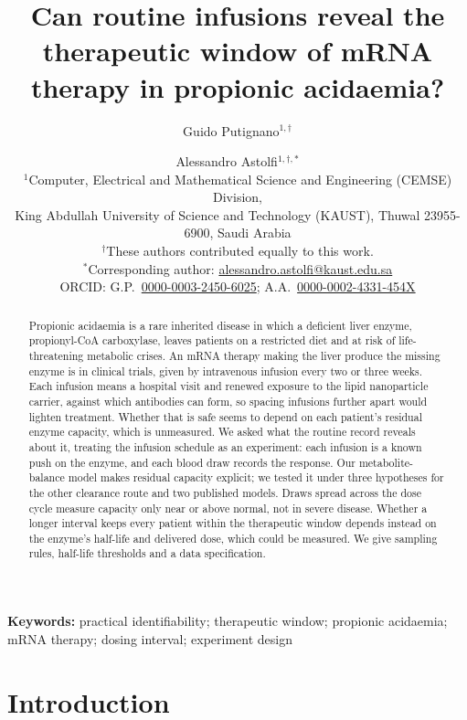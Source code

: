 \documentclass[11pt]{article}
\title{Can routine infusions reveal the therapeutic window of mRNA therapy in propionic
acidaemia?}
\author{Guido Putignano$^{1,\dagger}$ \and Alessandro Astolfi$^{1,\dagger,*}$\\[6pt]
\small $^{1}$Computer, Electrical and Mathematical Science and Engineering (CEMSE) Division,\\
\small King Abdullah University of Science and Technology (KAUST), Thuwal 23955-6900, Saudi
Arabia\\
\small $^{\dagger}$These authors contributed equally to this work.\\
\small $^{*}$Corresponding author:
\href{mailto:alessandro.astolfi@kaust.edu.sa}{alessandro.astolfi@kaust.edu.sa}\\[4pt]
\small ORCID: G.P.\ \href{https://orcid.org/0000-0003-2450-6025}{0000-0003-2450-6025};
A.A.\ \href{https://orcid.org/0000-0002-4331-454X}{0000-0002-4331-454X}}
\date{}
\begin{document}
\maketitle


\begin{abstract}
\noindent
Propionic acidaemia is a rare inherited disease in which a deficient liver enzyme,
propionyl-CoA carboxylase, leaves patients on a restricted diet and at risk of life-threatening
metabolic crises. An mRNA therapy making the liver produce the missing enzyme is in clinical
trials, given by intravenous infusion every two or three weeks. Each infusion means a hospital
visit and renewed exposure to the lipid nanoparticle carrier, against which antibodies can form,
so spacing infusions further apart would lighten treatment. Whether that is safe seems to depend
on each patient's residual enzyme capacity, which is unmeasured. We asked what the routine
record reveals about it, treating the infusion schedule as an experiment: each infusion
is a known push on the enzyme, and each blood draw records the response. Our metabolite-balance
model makes residual capacity explicit; we tested it under three hypotheses for the other
clearance route and two published models. Draws spread across the dose cycle
measure capacity only near or above normal, not in severe disease. Whether a longer interval
keeps every patient within the therapeutic window depends instead on the enzyme's half-life and
delivered dose, which could be measured. We give sampling rules, half-life thresholds and a data
specification.
\end{abstract}

\noindent\textbf{Keywords:} practical identifiability; therapeutic window; propionic acidaemia;
mRNA therapy; dosing interval; experiment design

\section*{Introduction}
\end{document}
